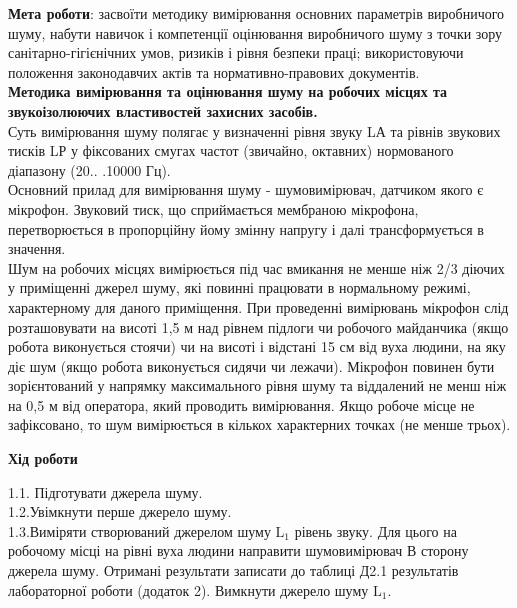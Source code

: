 \documentclass[a4paper,14pt]{extreport}
\begin{document}
\textbf{Мета роботи}: засвоїти методику вимірювання основних параметрів виробничого шуму, набути навичок і компетенції оцінювання виробничого шуму з точки зору санітарно-гігієнічних умов, ризиків і рівня безпеки праці; використовуючи положення законодавчих актів та нормативно-правових документів.\\


\textbf{Методика вимірювання та оцінювання шуму на робочих місцях та звукоізолюючих властивостей захисних засобів.}\\
Суть вимірювання шуму полягає у визначенні рівня звуку LА та рівнів звукових тисків LР у фіксованих смугах частот (звичайно, октавних) нормованого діапазону (20.. .10000 Гц).\\

Основний прилад для вимірювання шуму - шумовимірювач, датчиком якого є мікрофон. Звуковий тиск, що сприймається мембраною мікрофона, перетворюється в пропорційну йому змінну напругу і далі трансформується в значення.\\
Шум на робочих місцях вимірюється під час вмикання не менше ніж 2/3 діючих у приміщенні джерел шуму, які повинні працювати в нормальному режимі, характерному для даного приміщення. При проведенні вимірювань мікрофон слід розташовувати на висоті 1,5 м над рівнем підлоги чи робочого майданчика (якщо робота виконується стоячи) чи на висоті і відстані 15 см від вуха людини, на яку діє шум (якщо робота виконується сидячи чи лежачи). Мікрофон повинен бути зорієнтований у напрямку максимального рівня шуму та віддалений не менш ніж на 0,5 м від оператора, який проводить вимірювання. Якщо робоче місце не зафіксовано, то шум вимірюється в кількох характерних точках (не менше трьох).\\


\begin{center}\textbf{Хід роботи}\end{center}
\par
1.1. Підготувати джерела шуму.\\

1.2.Увімкнути перше джерело шуму.\\

1.3.Виміряти створюваний джерелом шуму $\mathrm{L}_{1}$ рівень звуку. Для цього на робочому місці на рівні вуха людини направити шумовимірювач В сторону джерела шуму. Отримані результати записати до таблиці Д2.1 результатів лабораторної роботи (додаток 2). Вимкнути джерело шуму $\mathrm{L}_{1} .$\\
\end{document}
